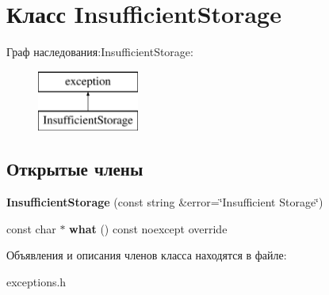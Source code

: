 \hypertarget{class_insufficient_storage}{}\section{Класс Insufficient\+Storage}
\label{class_insufficient_storage}
Граф наследования\+:Insufficient\+Storage\+:\begin{figure}[H]
\begin{center}
\leavevmode
\includegraphics[height=2.000000cm]{class_insufficient_storage}
\end{center}
\end{figure}
\subsection*{Открытые члены}
\begin{DoxyCompactItemize}
\item 
\mbox{\label{class_insufficient_storage_a59e341b5e13ba88092f7faf478268fd4}} 
{\bfseries Insufficient\+Storage} (const string \&error=\char`\"{}Insufficient Storage\char`\"{})
\item 
\mbox{\label{class_insufficient_storage_aa2807f5c9094788feb47434e735e9af0}} 
const char $\ast$ {\bfseries what} () const noexcept override
\end{DoxyCompactItemize}


Объявления и описания членов класса находятся в файле\+:\begin{DoxyCompactItemize}
\item 
exceptions.\+h\end{DoxyCompactItemize}
